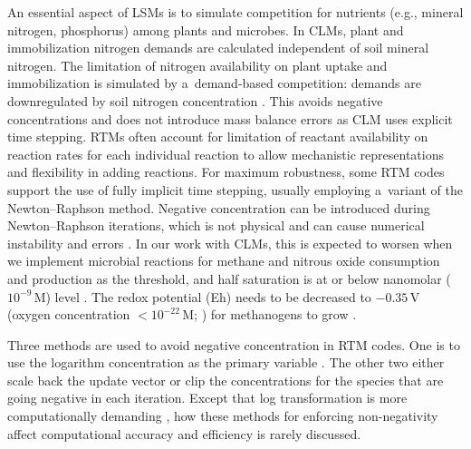\documentclass[gmd,noline]{copernicus}
\begin{document}
      An essential aspect of LSMs is to simulate competition for nutrients
      (e.g., mineral nitrogen, phosphorus) among plants and microbes. In
      CLMs, plant and immobilization nitrogen demands are calculated
      independent of soil mineral nitrogen. The limitation of nitrogen
      availability on plant uptake and immobilization is simulated by
      a~demand-based competition: demands are downregulated by soil nitrogen
      concentration \citep{Oleson2013,Thornton2005}.  This avoids negative
      concentrations and does not introduce mass balance errors
      \citep{Tang2015} as CLM uses explicit time stepping.
\hack{\newpage}
      RTMs often account for limitation of reactant availability on reaction
      rates for each individual reaction to allow mechanistic
      representations and flexibility in adding reactions. For maximum
      robustness, some RTM codes support the use of fully implicit time
      stepping, usually employing a~variant of the Newton--Raphson
      method. Negative concentration can be introduced during
      Newton--Raphson iterations, which is not physical and can cause
      numerical instability and errors \citep{Shampine2005}. In our work
      with CLMs, this is expected to worsen when we implement microbial
      reactions for methane and nitrous oxide consumption and production as
      the threshold, and half saturation is at or below nanomolar
      ($10^{-9}$\,\unit{M}) level \citep{Conrad1996}. The redox potential
      (Eh)
      needs to be decreased to $-0.35$\,\unit{V} (oxygen concentration
      $<10^{-22}$\,\unit{M}; \citealp{Hungate1975}) for methanogens to grow
      \citep{Jarrell1985}.

      Three methods are used to avoid negative concentration in RTM
      codes. One is to use the logarithm concentration as the primary
      variable \citep{Bethke2007,Hammond2003,Parkhurst1999}. The other two
      either scale back the update vector \citep{Bethke2007,Hammond2003} or
      clip the concentrations for the species that are going negative
      \citep{Yeh2004,White2005,Xu2014} in each iteration. Except that log
      transformation is more computationally demanding \citep{Hammond2003},
      how these methods for enforcing non-negativity affect computational
      accuracy and efficiency is rarely discussed.
\end{document}
